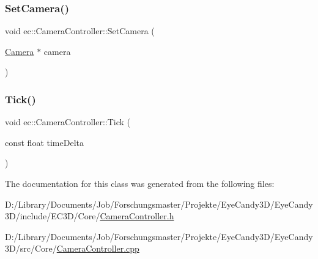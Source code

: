 \mbox{\label{classec_1_1_camera_controller_a3cbf6829af7035fa648ef9283f1f6b34}} 
\subsubsection{\texorpdfstring{Set\+Camera()}{SetCamera()}}
{\footnotesize\ttfamily void ec\+::\+Camera\+Controller\+::\+Set\+Camera (\begin{DoxyParamCaption}\item[{\mbox{\hyperlink{classec_1_1_camera}{Camera}} $\ast$}]{camera }\end{DoxyParamCaption})}

\mbox{\label{classec_1_1_camera_controller_a0f9378014e5501eec0af79fd7006a4d7}} 
\subsubsection{\texorpdfstring{Tick()}{Tick()}}
{\footnotesize\ttfamily void ec\+::\+Camera\+Controller\+::\+Tick (\begin{DoxyParamCaption}\item[{const float}]{time\+Delta }\end{DoxyParamCaption})}



The documentation for this class was generated from the following files\+:\begin{DoxyCompactItemize}
\item 
D\+:/\+Library/\+Documents/\+Job/\+Forschungsmaster/\+Projekte/\+Eye\+Candy3\+D/\+Eye\+Candy3\+D/include/\+E\+C3\+D/\+Core/\mbox{\hyperlink{_camera_controller_8h}{Camera\+Controller.\+h}}\item 
D\+:/\+Library/\+Documents/\+Job/\+Forschungsmaster/\+Projekte/\+Eye\+Candy3\+D/\+Eye\+Candy3\+D/src/\+Core/\mbox{\hyperlink{_camera_controller_8cpp}{Camera\+Controller.\+cpp}}\end{DoxyCompactItemize}
